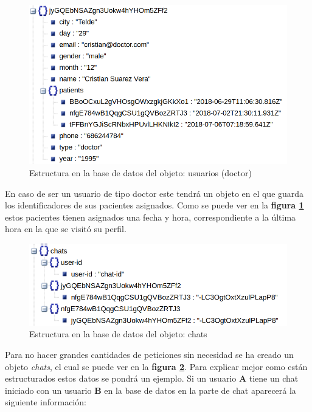 \medskip
\begin{figure}
    \includegraphics[width=\linewidth]{./images/database/users-doctor-database.png}
    \caption{Estructura en la base de datos del objeto: usuarios (doctor)}
    \label{usuario-doctor}
\end{figure}

En caso de ser un usuario de tipo doctor este tendrá un objeto en el que
guarda los identificadores de sus pacientes asignados. Como se puede ver
en la \textbf{figura \ref{usuario-doctor}} estos pacientes tienen asignados
una fecha y hora, correspondiente a la última hora en la que se visitó su
perfil.

\medskip
\begin{figure}
    \includegraphics[width=\linewidth]{./images/database/chats-database.png}
    \caption{Estructura en la base de datos del objeto: chats}
    \label{chat}
\end{figure}

Para no hacer grandes cantidades de peticiones sin necesidad
se ha creado un objeto \textit{chats}, el cual se puede ver en la
\textbf{figura \ref{chat}}. Para explicar mejor como están estructurados
estos datos se pondrá un ejemplo. Si un usuario \textbf{A} tiene un chat
iniciado con un usuario \textbf{B} en la base de datos en la parte de chat
aparecerá la siguiente información:

